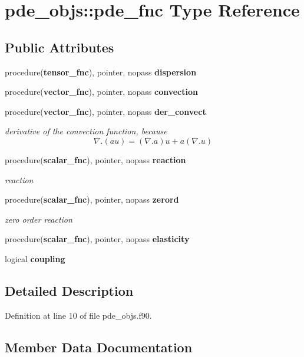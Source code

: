 \section{pde\+\_\+objs\+:\+:pde\+\_\+fnc Type Reference}
\label{structpde__objs_1_1pde__fnc}
\subsection*{Public Attributes}
\begin{DoxyCompactItemize}
\item 
procedure({\bf tensor\+\_\+fnc}), pointer, nopass {\bf dispersion}
\item 
procedure({\bf vector\+\_\+fnc}), pointer, nopass {\bf convection}
\item 
procedure({\bf vector\+\_\+fnc}), pointer, nopass {\bf der\+\_\+convect}
\begin{DoxyCompactList}\small\item\em derivative of the convection function, because \[ \nabla .(a u) = (\nabla . a) u + a (\nabla . u) \] \end{DoxyCompactList}\item 
procedure({\bf scalar\+\_\+fnc}), pointer, nopass {\bf reaction}
\begin{DoxyCompactList}\small\item\em reaction \end{DoxyCompactList}\item 
procedure({\bf scalar\+\_\+fnc}), pointer, nopass {\bf zerord}
\begin{DoxyCompactList}\small\item\em zero order reaction \end{DoxyCompactList}\item 
procedure({\bf scalar\+\_\+fnc}), pointer, nopass {\bf elasticity}
\item 
logical {\bf coupling}
\end{DoxyCompactItemize}


\subsection{Detailed Description}


Definition at line 10 of file pde\+\_\+objs.\+f90.



\subsection{Member Data Documentation}

